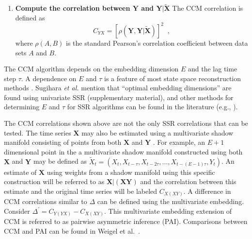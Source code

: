 \begin{enumerate}
\item {\bf Compute the correlation between $\mathbf{Y}$ and $\mathbf{Y}|\tilde{\mathbf{X}}$}
The CCM correlation is defined as 
\begin{equation}
C_{YX} = \left[\rho\left(\mathbf{Y},\mathbf{Y}|\tilde{\mathbf{X}}\right)\right]^2\;\;,
\end{equation}
where $\rho\left(A,B\right)$ is the standard Pearson's correlation coefficient between data sets $A$ and $B$.  
\end{enumerate}

The CCM algorithm depends on the embedding dimension $E$ and the lag time step $\tau$.  A dependence on $E$ and $\tau$ is a feature of most state space reconstruction methods \cite{Hong2006,vlachos2009,Small2004}.  Sugihara {\em et al.} mention that ``optimal embedding dimensions'' are found using univariate SSR \cite{Sugihara2012} (supplementary material), and other methods for determining $E$ and $\tau$ for SSR algorithms can be found in the literature (e.g., \cite{Hong2006,Small2004,Kennel1992}).

The CCM correlations shown above are not the only SSR correlations that can be tested.  The time series $\mathbf{X}$ may also be estimated using a multivariate shadow manifold consisting of points from both $\mathbf{X}$ and $\mathbf{Y}$ \cite{Deyle2013}.  For example, an $E+1$ dimensional point in the a multivariate shadow manifold constructed using both $\mathbf{X}$ and $\mathbf{Y}$ may be defined as $\tilde{X}_t=(X_t,X_{t-\tau},X_{t-2\tau},\ldots,X_{t-(E-1)\tau},Y_t)$.  An estimate of $\mathbf{X}$ using weights from a shadow manifold using this specific construction will be referred to as $\mathbf{X}|(\mathbf{XY})$ and the correlation between this estimate and the original time series will be labeled $C_{X(XY)}$.  A difference in CCM correlations similar to $\Delta$ can be defined using the multivariate embedding.  Consider $\Delta^\prime = C_{Y(YX)} - C_{X(XY)}$.  This multivariate embedding extension of CCM is referred to as pairwise asymmetric inference (PAI).  Comparisons between CCM and PAI can be found in Weigel et al.\ \cite{Weigel2014}.  

